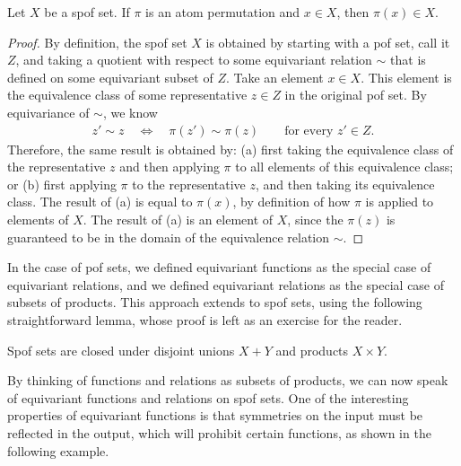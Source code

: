 \begin{lemma}
    Let $X$ be a spof set. If $\pi$ is an atom permutation and $x \in X$, then $\pi(x) \in X$.
\end{lemma}
\begin{proof}
        By definition,  the spof set $X$ is obtained by starting with a pof set, call it $Z$, and taking a quotient with respect to some equivariant relation $\sim$ that is defined on some equivariant subset of $Z$. 
        Take an element $x \in X$. This element is the equivalence class of some representative $z \in Z$ in the original pof set. By equivariance of $\sim$, we know 
        \begin{align*}
        z' \sim z
        \quad \Leftrightarrow \quad
        \pi(z') \sim \pi(z) 
        \qquad \text{for every $z' \in Z$}.
        \end{align*}
        Therefore, the  same result is obtained by: (a) first taking the equivalence class of the representative $z$ and then applying $\pi$ to all elements of this equivalence class; or (b) first applying $\pi$ to the representative $z$, and then taking its equivalence class.         The result of (a)  is equal to $\pi(x)$, by definition of how $\pi$ is applied to elements of $X$. The result of (a) is an element of $X$, since the $\pi(z)$ is guaranteed to be in the domain of the equivalence relation $\sim$. 
\end{proof}

In the case of pof sets, we defined equivariant functions as the special case of equivariant relations, and we defined equivariant relations as the special case of subsets of products. This approach extends to spof sets, using the following straightforward lemma, whose proof is left as an exercise for the reader. 
    \begin{lemma}
    Spof sets are closed under disjoint unions $X + Y$ and products $X \times Y$.
\end{lemma}
By thinking of functions and relations as subsets of products, we can now speak of equivariant functions and relations on spof sets. One of the interesting properties of equivariant functions is that symmetries on the input must be reflected in the output, which will prohibit certain functions, as shown in the following example.

